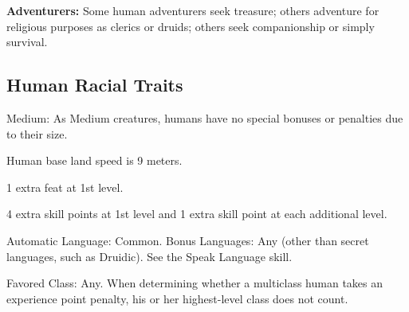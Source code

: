 \textbf{Adventurers:} Some human adventurers seek treasure; others adventure for religious purposes as clerics or druids; others seek companionship or simply survival.

\subsection{Human Racial Traits}
\begin{itemize*}
  \item Medium: As Medium creatures, humans have no special bonuses or penalties due to their size. 
  \item Human base land speed is 9 meters.
  \item 1 extra feat at 1st level.
  \item 4 extra skill points at 1st level and 1 extra skill point at each additional level.
  \item Automatic Language: Common. Bonus Languages: Any (other than secret languages, such as Druidic). See the Speak Language skill.
  \item Favored Class: Any. When determining whether a multiclass human takes an experience point penalty, his or her highest-level class does not count.
\end{itemize*}
